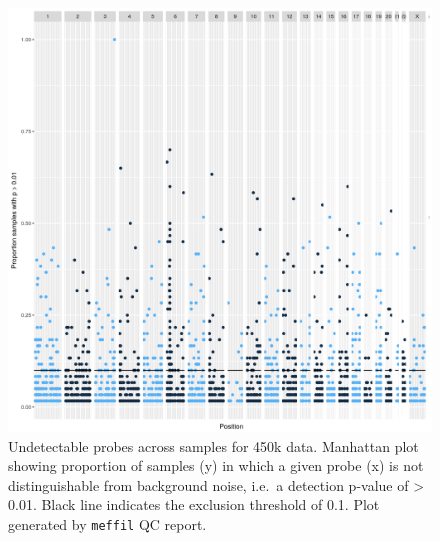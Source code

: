 \documentclass[
]{book}
\begin{document}
\begin{figure}

{\centering \includegraphics[width=0.8\linewidth]{figs/MAVIDOSqc450kpropSamples} 

}

\caption{Undetectable probes across samples for 450k data. Manhattan plot showing proportion of samples (y) in which a given probe (x) is not distinguishable from background noise, i.e.~a detection p-value of \textgreater{} 0.01. Black line indicates the exclusion threshold of 0.1. Plot generated by \texttt{meffil} QC report.}\label{fig:MAVIDOSqc450kpropSamples}
\end{figure}
\end{document}
